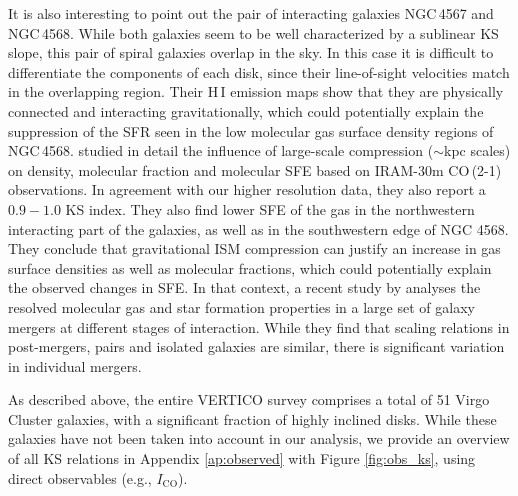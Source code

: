 \documentclass[longauth]{aa}
\begin{document}
\smallskip

It is also interesting to point out the pair of interacting galaxies NGC\,4567 and NGC\,4568. While both galaxies seem to be well characterized by a sublinear KS slope, this pair of spiral galaxies overlap in the sky. In this case it is difficult to differentiate the components of each disk, since their line-of-sight velocities match in the overlapping region. Their H\,I emission maps \citep{Chung2009} show that they are physically connected and interacting gravitationally, which could potentially explain the suppression of the SFR seen in the low molecular gas surface density regions of NGC\,4568. \citet{Nehlig2016} studied in detail the influence of large-scale compression ($\sim$kpc scales) on density, molecular fraction and molecular SFE based on IRAM-30m CO\,(2-1) observations. In agreement with our higher resolution data, they also report a $0.9-1.0$ KS index. They also find lower SFE of the gas in the northwestern interacting part of the galaxies, as well as in the southwestern edge of NGC 4568. They conclude that gravitational ISM compression can justify an increase in gas surface densities as well as molecular fractions, which could potentially explain the observed changes in SFE. In that context, a recent study by \citet{Thorp2022} analyses the resolved molecular gas and star formation properties in a large set of galaxy mergers at different stages of interaction. While they find that scaling relations in post-mergers, pairs and isolated galaxies are similar, there is significant variation in individual mergers.

As described above, the entire VERTICO survey comprises a total of 51 Virgo Cluster galaxies, with a significant fraction of highly inclined disks. While these galaxies have not been taken into account in our analysis, we provide an overview of all KS relations in Appendix \ref{ap:observed} with Figure \ref{fig:obs_ks}, using direct observables (e.g., $I_\mathrm{CO}$).
\end{document}
